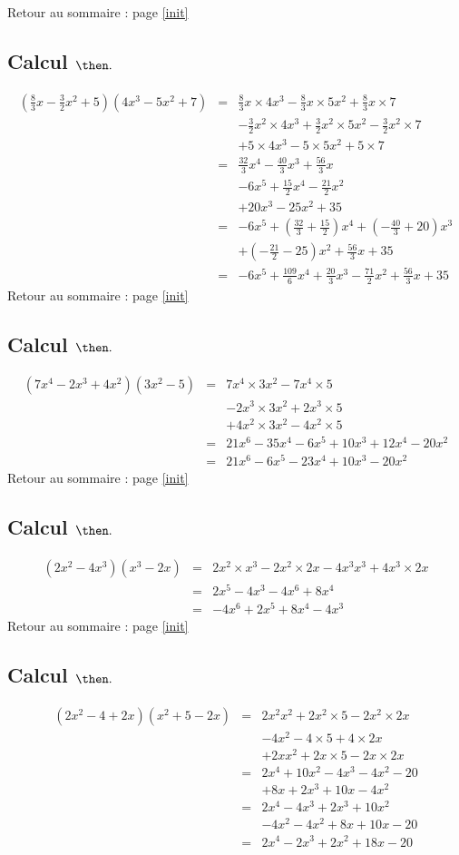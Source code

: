 \documentclass[14pt]{article}
\theoremstyle{remark}
\newcounter{n}
\renewcommand{\it}{Retour au sommaire : page \ref{init}
	\subsection{Calcul $ \mathbf{ \then}.$}\label{\then} \stepcounter{n} }
\theoremstyle{plain}
\begin{document}
\it \begin{eqnarray*}\left(\frac83x-\frac32x^2+5\right)(4x^3-5x^2+7)&=& 
\frac83x\times4x^3 -\frac83x\times5x^2 +\frac83x\times7\\
&&-\frac32x^2\times4x^3 + \frac32x^2\times5x^2 -\frac32x^2\times7\\ 
&&+5\times4x^3-5\times5x^2 +5\times 7\\
&=& \frac{32}3x^4 -\frac{40}3x^3 +\frac{56}3x\\
&&-6x^5 +\frac{15}2x^4 - \frac{21}2x^2\\
&&+20x^3-25x^2+35\\
&=& -6x^5+\left(\frac{32}3+\frac{15}2\right)x^4+\left(
-\frac{40}3+20\right)x^3\\&&+\left(-\frac{21}2-25\right)x^2 +\frac{56}3x+35\\
&=&-6x^5 +\frac{109}6 x^4 + \frac{20}3x^3 - \frac{71}2x^2+\frac{56}3x+35
\end{eqnarray*}
\it \begin{eqnarray*}(7x^4-2x^3+4x^2)(3x^2-5)
&=& 7x^4\times 3x^2 -7x^4\times 5 \\
&& -2x^3\times 3x^2 +2x^3\times 5\\
&& +4x^2\times 3x^2 -4x^2\times 5\\
&=& 21x^6 - 35 x^4 - 6x^5 +10x^3 +12x^4 - 20x^2\\
&=& 21x^6 -6x^5 - 23 x^4 +10x^3 - 20x^2\end{eqnarray*}
\it \begin{eqnarray*}(2x^2-4x^3)(x^3-2x) &=& 2x^2\times x^3
-2x^2\times 2x -4x^3x^3 +4x^3\times 2x\\
&=& 2x^5 -4x^3 -4x^6 +8x^4\\
&=& -4x^6+2x^5+8x^4-4x^3
\end{eqnarray*}
\it \begin{eqnarray*}(2x^2-4+2x)(x^2+5-2x)
&=& 2x^2x^2 + 2x^2\times 5 -2x^2\times 2x\\
&& -4x^2 -4\times 5 +4\times 2x\\
&&+2xx^2+2x\times 5-2x\times2x\\
&=& 2x^4+10x^2-4x^3-4x^2-20\\&&+8x+2x^3+10x-4x^2\\
&=& 2x^4-4x^3+2x^3+10x^2\\&&-4x^2-4x^2+8x+10x-20\\
&=& 2x^4-2x^3+2x^2+18x-20\end{eqnarray*}
\end{document}
